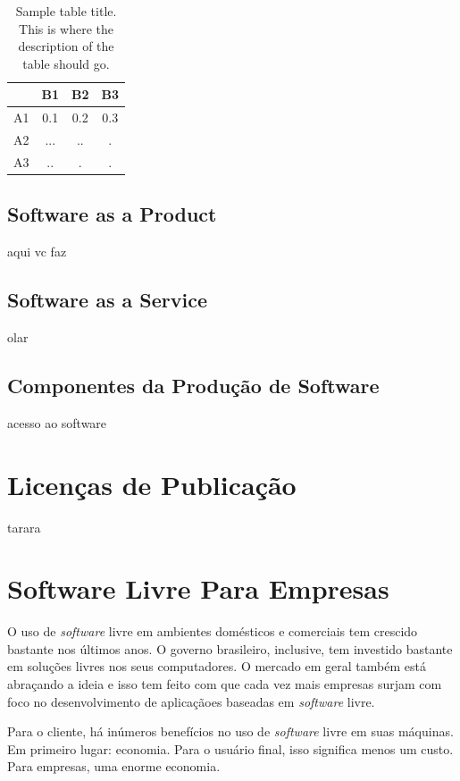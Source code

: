 \documentclass{classe_cn}                 %
\begin{document}
\begin{table}[h!]
\label{tag_tabela_01}
\caption{Sample table title. This is where the description of the table should go.}
  \begin{tabular}{cccc}
  \hline
       & B1   & B2   & B3   \\ \hline
   A1  & 0.1  & 0.2  & 0.3  \\
   A2  & ...  & ..   & .    \\
   A3  & ..   & .    & .    \\ \hline
  \end{tabular}
\end{table}

\subsection{Software as a Product}

aqui vc faz

\subsection{Software as a Service}

olar

\subsection{Componentes da Produção de Software}

acesso ao software

\section{Licenças de Publicação}

tarara

\section{Software Livre Para Empresas}

O uso de \textit{software} livre em ambientes domésticos e comerciais tem crescido bastante nos últimos anos. O governo brasileiro, inclusive, tem investido bastante em soluções livres nos seus computadores. O mercado em geral também está abraçando a ideia e isso tem feito com que cada vez mais empresas surjam com foco no desenvolvimento de aplicaçãoes baseadas em \textit{software} livre.

Para o cliente, há inúmeros benefícios no uso de \textit{software} livre em suas máquinas. Em primeiro lugar: economia. Para o usuário final, isso significa menos um custo. Para empresas, uma enorme economia.
\end{document}
